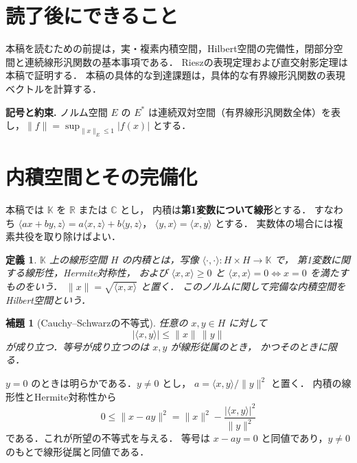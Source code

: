 \documentclass[a5paper,10pt,onecolumn]{jsarticle}
\makeatletter
\theoremstyle{mathnotetheorem}
\newtheorem{definition}[theorem]{定義}
\newtheorem{lemma}[theorem]{補題}
\renewcommand{\proofname}{証明}
\renewenvironment{proof}[1][\proofname]{%
  \par\pushQED{\qed}\normalfont\topsep4\p@\@plus2\p@\relax
  \trivlist\item[\hskip\labelsep\bfseries #1]\ignorespaces
}{\popQED\endtrivlist\@endpefalse}
\makeatother
\begin{document}
\section*{読了後にできること}
本稿を読むための前提は，実・複素内積空間，Hilbert空間の完備性，閉部分空間と連続線形汎関数の基本事項である．
Rieszの表現定理および直交射影定理は本稿で証明する．
本稿の具体的な到達課題は，具体的な有界線形汎関数の表現ベクトルを計算する．


\par\noindent\textbf{記号と約束.}\quad
ノルム空間 $E$ の $E^*$ は連続双対空間（有界線形汎関数全体）を表し，$\|f\|=\sup_{\|x\|_E\le1}|f(x)|$ とする．
\par

\section{内積空間とその完備化}

本稿では $\mathbb K$ を $\mathbb R$ または $\mathbb C$ とし，
内積は\textbf{第1変数について線形}とする．
すなわち $\langle ax+by,z\rangle
=a\langle x,z\rangle+b\langle y,z\rangle$，
$\langle y,x\rangle=\overline{\langle x,y\rangle}$ とする．
実数体の場合には複素共役を取り除けばよい．

\begin{definition}
$\mathbb K$ 上の線形空間 $H$ の内積とは，写像
$\langle\cdot,\cdot\rangle:H\times H\to\mathbb K$ で，
第1変数に関する線形性，Hermite対称性，
および $\langle x,x\rangle\ge0$ と
$\langle x,x\rangle=0\Longleftrightarrow x=0$ を満たすものをいう．
$\|x\|=\sqrt{\langle x,x\rangle}$ と置く．
このノルムに関して完備な内積空間を\emph{Hilbert空間}という．
\end{definition}

\begin{lemma}[Cauchy--Schwarzの不等式]
任意の $x,y\in H$ に対して
\[
 |\langle x,y\rangle|\le\|x\|\,\|y\|
\]
が成り立つ．等号が成り立つのは $x,y$ が線形従属のとき，
かつそのときに限る．
\end{lemma}
\begin{proof}
$y=0$ のときは明らかである．$y\ne0$ とし，
$a=\langle x,y\rangle/\|y\|^2$ と置く．
内積の線形性とHermite対称性から
\[
0\le\|x-ay\|^2
=\|x\|^2-\frac{|\langle x,y\rangle|^2}{\|y\|^2}
\]
である．これが所望の不等式を与える．
等号は $x-ay=0$ と同値であり，$y\ne0$ のもとで線形従属と同値である．
\end{proof}
\end{document}
